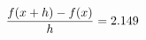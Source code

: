 \documentclass[preview]{standalone}
\begin{document}
\begin{align*}
\special{dvisvgm:raw <g id='unique000'>}\frac{f(x+h)-f(x)}{h} = 2.149\special{dvisvgm:raw </g>}
\end{align*}
\end{document}
